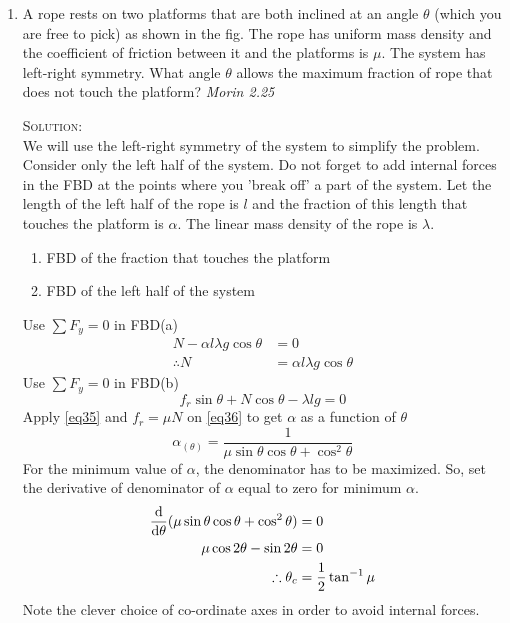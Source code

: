 \begin{enumerate}
\item A rope rests on two platforms that are both inclined at an angle $\theta$ (which you are free to pick) as shown in the fig. The rope has uniform mass density and the coefficient of friction between it and the platforms is $\mu$. The system has left-right symmetry. What angle $\theta$ allows the maximum fraction of rope that does not touch the platform? \hfill \textsl{Morin 2.25}
\begin{figure}[hbt]
    \centering
    
\end{figure}

\textsc{Solution:}\\
We will use the left-right symmetry of the system to simplify the problem. Consider only the left half of the system. Do not forget to add internal forces in the FBD at the points where you 'break off' a part of the system. Let the length of the left half of the rope is $l$ and the fraction of this length that touches the platform is $\alpha$. The linear mass density of the rope is $\lambda$.
\begin{enumerate}
\item FBD of the fraction that touches the platform
\begin{figure}[hbt]
    \centering
    
\end{figure}
\item FBD of the left half of the system
\begin{figure}[hbt]
    \centering
    
\end{figure}
\end{enumerate}
Use $\sum F_y=0$ in FBD(a)
\begin{align}
N-\alpha l \lambda g \cos\theta &= 0 \nonumber\\
\therefore N&= \alpha l \lambda g \cos\theta	\label{eq35}
\end{align}
Use $\sum F_y=0$ in FBD(b)
\begin{equation}
f_r\sin\theta+N\cos\theta-\lambda lg=0	\label{eq36}
\end{equation}
Apply \eqref{eq35} and $f_r=\mu N$ on \eqref{eq36} to get $\alpha$ as a function of $\theta$
\begin{equation*}
\alpha_{(\theta)}=\frac{1}{\mu\sin\theta\cos\theta+\cos^2\theta}
\end{equation*}
For the minimum value of $\alpha$, the denominator has to be maximized. So, set the derivative of denominator of $\alpha$ equal to zero for minimum $\alpha$.
\begin{align*}
\frac{\displaystyle \mathop{}\!\mathrm{d}}{\displaystyle \mathop{}\!\mathrm{d} \theta}(\mu\sin\theta\cos\theta+\cos^2\theta)&=0\\
\mu\cos2\theta - \sin2\theta&=0\\
\therefore \theta_c&=\frac{\displaystyle 1}{\displaystyle 2}\tan^{-1}\mu
\end{align*}
Note the clever choice of co-ordinate axes in order to avoid internal forces.


\end{enumerate}
